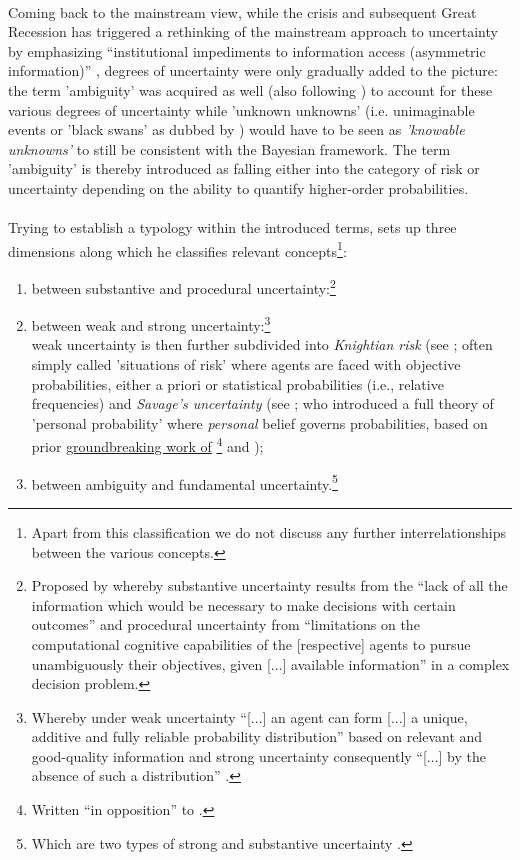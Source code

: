 \documentclass[a4paper,11pt,listof=nochaptergap,oneside,pointednumbers,bibtotoc,bigheadings,liststotoc]{scrbook}
\begin{document}
\\
Coming back to the mainstream view, while the crisis and subsequent Great Recession has triggered a rethinking of the mainstream approach to uncertainty by emphasizing ``institutional impediments to information access (asymmetric information)'' \citep[p. 8]{dow:16}, degrees of uncertainty were only gradually added to the picture: the term 'ambiguity' was acquired as well (also following \citealp[p. 330]{camererandweber:92}) to account for these various degrees of uncertainty while 'unknown unknowns' (i.e. unimaginable events or 'black swans' as dubbed by \citealp{taleb:08}) would have to be seen as \textit{'knowable unknowns'} to still be consistent with the Bayesian framework. The term 'ambiguity' is thereby introduced as falling either into the category of risk or uncertainty depending on the ability to quantify higher-order probabilities.
\\
\\
Trying to establish a typology within the introduced terms, \citet{dequech:14}  sets up three dimensions along which he classifies relevant concepts\footnote{Apart from this classification we do not discuss any further interrelationships between the various concepts.}: 
\begin{enumerate}
	\item between substantive and procedural uncertainty:\footnote{Proposed by \citet[p. 145]{dosiandegidi:91} whereby substantive uncertainty results from the ``lack of all the information which would be necessary to make decisions with certain outcomes'' and procedural uncertainty from ``limitations on the computational cognitive capabilities of the [respective] agents to pursue unambiguously their objectives, given [...] available information'' in a complex decision problem. }
	\item between weak and strong uncertainty:\footnote{Whereby under weak uncertainty ``[...] an agent can form [...] a unique, additive and fully reliable probability distribution'' based on relevant and good-quality information and strong uncertainty consequently ``[...] by the absence of such a distribution'' \citep[p. 622/623]{dequech:14}.} \\
	weak uncertainty is then further subdivided into \textit{Knightian risk} (see \citet{knight:21}; often simply called 'situations of risk' where agents are faced with objective probabilities, either a priori or statistical probabilities (i.e., relative frequencies) and \textit{Savage's uncertainty} (see \citet{savage:54}; who introduced a full theory of 'personal probability' where \textit{personal} belief governs probabilities, based on prior \href{https://archive.org/stream/in.ernet.dli.2015.223806/2015.223806.The-Foundations#page/n289/mode/2up}{groundbreaking work of} \href{http://www.brunodefinetti.it/Link/Subjective%20Expected%20Utility%20-%20Intro.htm}{\citet{ramsey:26}\footnote{Written ``in opposition'' to \citet{keynes:21}.} and \citet{finetti:37}});
	\item between ambiguity and fundamental uncertainty.\footnote{Which are two types of strong and substantive uncertainty \citep{dequesh:00}.}
\end{enumerate}
\vspace{1cm}
\end{document}
